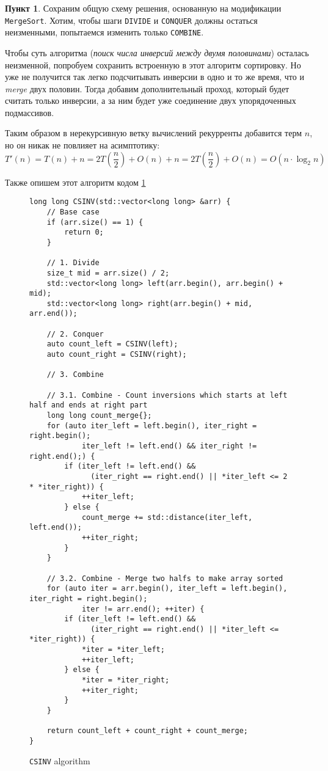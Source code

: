 \documentclass[11pt,a4paper]{scrarticle}
\theoremstyle{definition}
\newtheorem{subtask}{Пункт}
\begin{document}
\begin{subtask}
    Сохраним общую схему решения, основанную на модификации \texttt{MergeSort}. Хотим, чтобы шаги \texttt{DIVIDE} и \texttt{CONQUER} должны остаться неизменными, попытаемся изменить только \texttt{COMBINE}.

    Чтобы суть алгоритма (\emph{поиск числа инверсий между двумя половинами}) осталась неизменной, попробуем сохранить встроенную в этот алгоритм сортировку. Но уже не получится так легко подсчитывать инверсии в одно и то же время, что и \emph{merge} двух половин. Тогда добавим дополнительный проход, который будет считать только инверсии, а за ним будет уже соединение двух упорядоченных подмассивов.

    Таким образом в нерекурсивную ветку вычислений рекурренты добавится терм $n$, но он никак не повлияет на асимптотику:
    \begin{equation}
        T'(n) = T(n) + n = 2T\left(\frac{n}{2}\right) + O(n) + n = 2T\left(\frac{n}{2}\right) + O(n) = O(n \cdot \log_2 n)
    \end{equation}

    Также опишем этот алгоритм кодом \ref{fig:CSINV}

    \begin{figure}[h]
        \centering
        \begin{verbatim}
long long CSINV(std::vector<long long> &arr) {
    // Base case
    if (arr.size() == 1) {
        return 0;
    }

    // 1. Divide
    size_t mid = arr.size() / 2;
    std::vector<long long> left(arr.begin(), arr.begin() + mid);
    std::vector<long long> right(arr.begin() + mid, arr.end());

    // 2. Conquer
    auto count_left = CSINV(left);
    auto count_right = CSINV(right);
    
    // 3. Combine

    // 3.1. Combine - Count inversions which starts at left half and ends at right part 
    long long count_merge{};
    for (auto iter_left = left.begin(), iter_right = right.begin();
            iter_left != left.end() && iter_right != right.end();) {
        if (iter_left != left.end() &&
              (iter_right == right.end() || *iter_left <= 2 * *iter_right)) {
            ++iter_left;
        } else {
            count_merge += std::distance(iter_left, left.end());
            ++iter_right;                
        }
    }

    // 3.2. Combine - Merge two halfs to make array sorted
    for (auto iter = arr.begin(), iter_left = left.begin(), iter_right = right.begin();
            iter != arr.end(); ++iter) {
        if (iter_left != left.end() &&
              (iter_right == right.end() || *iter_left <= *iter_right)) {
            *iter = *iter_left;
            ++iter_left;
        } else {
            *iter = *iter_right;
            ++iter_right;
        }
    }
    
    return count_left + count_right + count_merge;
}
        \end{verbatim}
        \caption{\label{fig:CSINV} \texttt{CSINV} algorithm}
    \end{figure}

\end{subtask}
\end{document}
